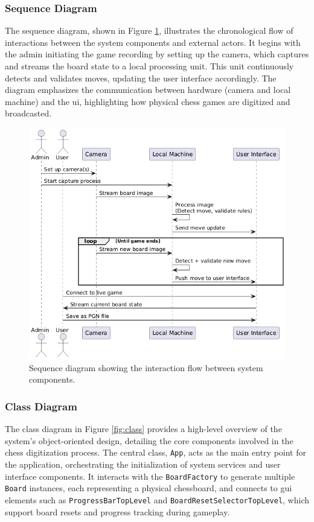 \subsubsection*{Sequence Diagram}
\label{subsubsec:sequence-diagram}

The sequence diagram, shown in Figure \ref{fig:sequence}, illustrates the chronological flow of interactions between the system components and external actors. It begins with the admin initiating the game recording by setting up the camera, which captures and streams the board state to a local processing unit. This unit continuously detects and validates moves, updating the user interface accordingly. The diagram emphasizes the communication between hardware (camera and local machine) and the \gls{ui}, highlighting how physical chess games are digitized and broadcasted.


\begin{figure}[h!]
    \centering
    \includegraphics[width=0.75\linewidth]{figures/results/uml/sequence.png}
    \caption[Sequence diagram]{Sequence diagram showing the interaction flow between system components.}
    \label{fig:sequence}
\end{figure}



\subsubsection*{Class Diagram}

The class diagram in Figure \ref{fig:class} provides a high-level overview of the system’s object-oriented design, detailing the core components involved in the chess digitization process. The central class, \texttt{App}, acts as the main entry point for the application, orchestrating the initialization of system services and user interface components. It interacts with the \texttt{BoardFactory} to generate multiple \texttt{Board} instances, each representing a physical chessboard, and connects to \gls{gui} elements such as \texttt{ProgressBarTopLevel} and \texttt{BoardResetSelectorTopLevel}, which support board resets and progress tracking during gameplay. \\


